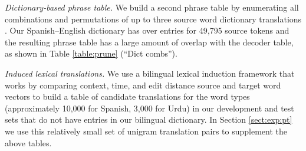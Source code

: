 \documentclass[11pt]{article}
\newcommand{\paraheader}[1]{\vskip 0.05in \noindent\emph{#1}}
\begin{document}
\paraheader{Dictionary-based phrase table.} We build a second phrase table by enumerating all combinations and permutations of up to three source word dictionary translations \cite{garera08a}. Our Spanish--English dictionary has over entries for 49,795 source tokens and the resulting phrase table has a large amount of overlap with the decoder table, as shown in Table \ref{table:prune} (``Dict combs''). 

\paraheader{Induced lexical translations.} We use a bilingual lexical induction framework that works by comparing context, time, and edit distance source and target word vectors to build a table of candidate translations for the word types (approximately 10,000 for Spanish, 3,000 for Urdu) in our development and test sets that do not have entries in our bilingual dictionary. In Section \ref{sect:exp:pt} we use this relatively small set of unigram translation pairs to supplement the above tables.

\end{document}
